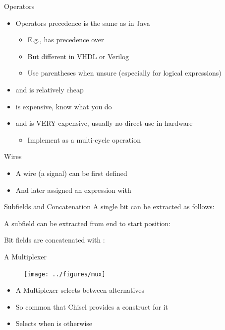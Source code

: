 \begin{frame}[fragile]{Operators}
\begin{itemize}
\item Operators precedence is the same as in Java
\begin{itemize}
\item E.g., \code{*} has precedence over \code{+}
\item But different in VHDL or Verilog
\item Use parentheses when unsure (especially for logical expressions)
\end{itemize}
\item \code{+} and \code{-} is relatively cheap
\item \code{*} is expensive, know what you do
\item \code{/} and \code{\%} is VERY expensive, usually no direct use in hardware
\begin{itemize}
\item Implement as a multi-cycle operation
\end{itemize}
\end{itemize}
\end{frame}

\begin{frame}[fragile]{Wires}
\begin{itemize}
\item A wire (a signal) can be first defined
\item And later assigned an expression with \code{:=}
\end{itemize}
\end{frame}

\begin{frame}[fragile]{Subfields and Concatenation}
A single bit can be extracted as follows:

\noindent A subfield can be extracted from end to start position:

\noindent Bit fields are concatenated with :
\end{frame}


\begin{frame}[fragile]{A Multiplexer}
\begin{figure}
  \texttt{[image: ../figures/mux]}
\end{figure}
\begin{itemize}
\item A Multiplexer selects between alternatives
\item So common that Chisel provides a construct for it
\item Selects  when  is  otherwise 
\end{itemize}
\end{frame}


